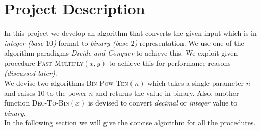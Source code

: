 \documentclass[12pt,a4paper]{article}%
\begin{document}
	\pagebreak
	\tableofcontents
	\cleardoublepage
	\section{Project Description}\label{sec:intro}
	\begin{flushleft}
		In this project we develop an algorithm that converts the given input which is in \textit{integer (base $10$)} format to \textit{binary (base $2$)} representation. We use one of the algorithm paradigms \textit{Divide and Conquer} to achieve this. We exploit given procedure \textsc{Fast-Multiply}$(x,y)$ to achieve this for performance reasons \textit{(discussed later)}.\\\bigskip
		We devise two algorithms \textsc{Bin-Pow-Ten}$(n)$ which takes a single parameter $n$ and raises $10$ to the power $n$ and returns the value in binary. Also, another function \textsc{Dec-To-Bin}$(x)$ is devised to convert \textit{decimal} or \textit{integer} value to \textit{binary}.\\\bigskip
		In the following section we will give the concise algorithm for all the procedures.
	\end{flushleft}
\end{document}
